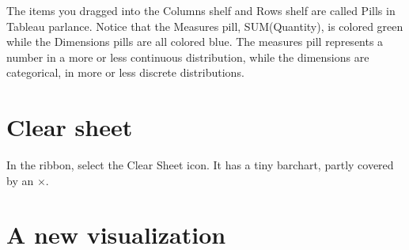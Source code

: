 The items you dragged into the Columns shelf and Rows shelf are called
Pills in Tableau parlance. Notice that the Measures pill, SUM(Quantity),
is colored green while the Dimensions pills are all colored blue. The
measures pill represents a number in a more or less continuous
distribution, while the dimensions are categorical, in more or less
discrete distributions.

\section{Clear sheet}\label{clear-sheet}

In the ribbon, select the Clear Sheet icon. It has a tiny barchart,
partly covered by an \(\times\).

\section{A new visualization}\label{a-new-visualization}

